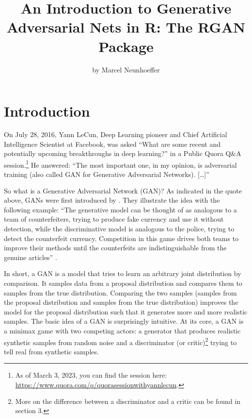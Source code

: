 \title{An Introduction to Generative Adversarial Nets in R: The RGAN Package}


\author{by Marcel Neunhoeffer}

\maketitle


\section{Introduction}\label{sec:intro}

On July 28, 2016, Yann LeCun, Deep Learning pioneer and Chief Artificial Intelligence Scientist at Facebook, was asked ``What are some recent and potentially upcoming breakthroughs in deep learning?'' in a Public Quora Q\&A session.\footnote{As of March 3, 2023, you can find the session here: \url{https://www.quora.com/q/quorasessionwithyannlecun}.} He answered: ``The most important one, in my opinion, is adversarial training (also called GAN for Generative Adversarial Networks). {[}\ldots{]}''

So what is a Generative Adversarial Network (GAN)? As indicated in the quote above, GANs were first introduced by \citet{Goodfellow2014}. They illustrate the idea with the following example: ``The generative model can be thought of as analogous to a team of counterfeiters, trying to produce fake currency and use it without detection, while the discriminative model is analogous to the police, trying to detect the counterfeit currency. Competition in this game drives both teams to improve their methods until the counterfeits are indistinguishable from the genuine articles'' \citep[ p.~1]{Goodfellow2014}.

In short, a GAN is a model that tries to learn an arbitrary joint distribution by comparison. It samples data from a proposal distribution and compares them to samples from the true distribution. Comparing the two samples (samples from the proposal distribution and samples from the true distribution) improves the model for the proposal distribution such that it generates more and more realistic samples. The basic idea of a GAN is surprisingly intuitive. At its core, a GAN is a minimax game with two competing actors: a generator that produces realistic synthetic samples from random noise and a discriminator (or critic)\footnote{More on the difference between a discriminator and a critic can be
  found in section 3.} trying to tell real from synthetic samples.

